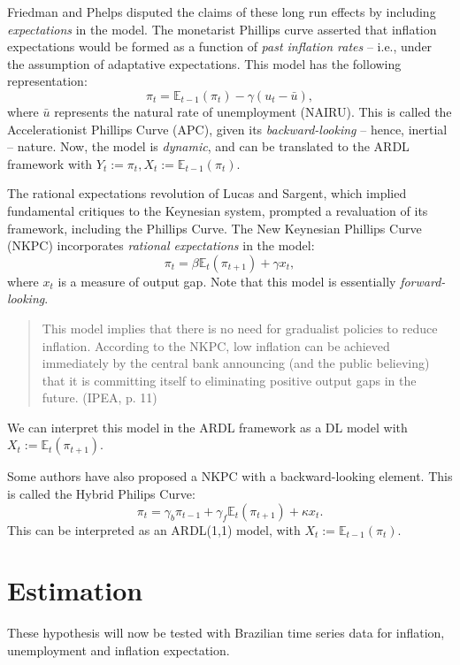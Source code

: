\documentclass[
]{article}
\begin{document}
Friedman and Phelps disputed the claims of these long run effects by
including \emph{expectations} in the model. The monetarist Phillips
curve asserted that inflation expectations would be formed as a function
of \emph{past inflation rates} -- i.e., under the assumption of
adaptative expectations. This model has the following representation:
\[ \pi_t = \mathbb{E}_{t-1}(\pi_t) - \gamma (u_t - \bar{u}), \] where
\(\bar{u}\) represents the natural rate of unemployment (NAIRU). This is
called the Accelerationist Phillips Curve (APC), given its
\emph{backward-looking} -- hence, inertial -- nature. Now, the model is
\emph{dynamic}, and can be translated to the ARDL framework with
\(Y_t := \pi_t, X_t := \mathbb{E}_{t-1}(\pi_t)\).

The rational expectations revolution of Lucas and Sargent, which implied
fundamental critiques to the Keynesian system, prompted a revaluation of
its framework, including the Phillips Curve. The New Keynesian Phillips
Curve (NKPC) incorporates \emph{rational expectations} in the model:
\[\pi_t = \beta \mathbb{E}_t (\pi_{t+1}) + \gamma x_t, \] where \(x_t\)
is a measure of output gap. Note that this model is essentially
\emph{forward-looking}.\\

\begin{quote}
This model implies that there is no need for gradualist policies to reduce inflation. According to the NKPC, low inflation can be achieved immediately by the central bank announcing (and the public believing) that it is committing itself to eliminating positive output gaps in the future. (IPEA, p. 11)
\end{quote}

We can interpret this model in the ARDL framework as a DL model with
\(X_t := \mathbb{E}_{t}(\pi_{t+1})\).

Some authors have also proposed a NKPC with a backward-looking element.
This is called the Hybrid Philips Curve:
\[ \pi_t = \gamma_b \pi_{t-1} + \gamma_f \mathbb{E}_t (\pi_{t+1}) + \kappa x_t. \]
This can be interpreted as an ARDL(1,1) model, with
\(X_t := \mathbb{E}_{t-1}(\pi_t)\).

\section{Estimation}

These hypothesis will now be tested with Brazilian time series data for
inflation, unemployment and inflation expectation.
\end{document}
